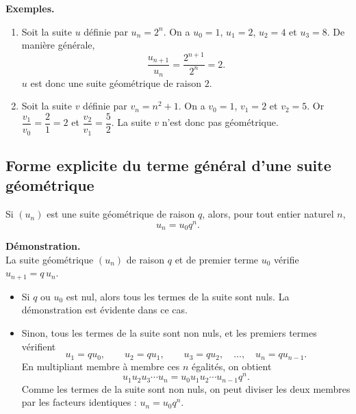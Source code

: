 \documentclass[11pt]{article}
\newenvironment{exemples}{\par\smallskip\noindent\textbf{Exemples. \\}\ignorespaces}{\par\smallskip}
\newenvironment{demonstration}{\par\smallskip\noindent\textbf{Démonstration. \\}\ignorespaces}{\par\smallskip}
\begin{document}
\begin{exemples}
\begin{enumerate}[label=\arabic*.]
    \item Soit la suite $u$ définie par $u_n=2^n$. On a $u_0=1$, $u_1=2$, $u_2=4$ et $u_3=8$. De manière générale,
    \[
    \frac{u_{n+1}}{u_n}=\frac{2^{n+1}}{2^n}=2.
    \]
    $u$ est donc une suite géométrique de raison $2$.
    \item Soit la suite $v$ définie par $v_n=n^2+1$. On a $v_0=1$, $v_1=2$ et $v_2=5$. Or $\dfrac{v_1}{v_0}=\dfrac21=2$ et $\dfrac{v_2}{v_1}=\dfrac52$. La suite $v$ n'est donc pas géométrique.
\end{enumerate}
\end{exemples}

\subsection{Forme explicite du terme général d'une suite géométrique}

\begin{propriete}
Si $(u_n)$ est une suite géométrique de raison $q$, alors, pour tout entier naturel $n$,
\[
u_n=u_0q^n.
\]
\end{propriete}

\begin{demonstration}
La suite géométrique $(u_n)$ de raison $q$ et de premier terme $u_0$ vérifie $u_{n+1}=q\,u_n$.
\begin{itemize}
    \item Si $q$ ou $u_0$ est nul, alors tous les termes de la suite sont nuls. La démonstration est évidente dans ce cas.
    \item Sinon, tous les termes de la suite sont non nuls, et les premiers termes vérifient
    \[
    u_1=qu_0,\qquad u_2=qu_1,\qquad u_3=qu_2,\quad\ldots,\quad u_n=qu_{n-1}.
    \]
    En multipliant membre à membre ces $n$ égalités, on obtient
    \[
    u_1u_2u_3\cdots u_n=u_0u_1u_2\cdots u_{n-1}q^n.
    \]
    Comme les termes de la suite sont non nuls, on peut diviser les deux membres par les facteurs identiques : $u_n=u_0q^n$.
\end{itemize}
\end{demonstration}
\end{document}
